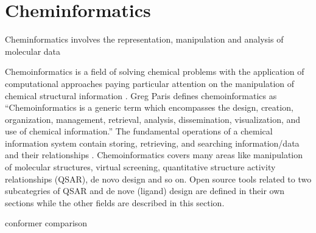 \section{Cheminformatics}
 
Cheminformatics involves the representation, manipulation and analysis of molecular data
  
  Chemoinformatics is a field of solving chemical problems with the application of computational approaches paying particular attention on the manipulation of chemical structural information \cite{Leach_2007} . Greg Paris defines chemoinformatics as “Chemoinformatics is a generic term which encompasses the design, creation, organization, management, retrieval, analysis, dissemination, visualization, and use of chemical information.” The fundamental operations of a chemical information system contain storing, retrieving, and searching information/data and their relationships \cite{Gasteiger_2003}\cite{2003}. Chemoinformatics covers many areas like manipulation of molecular structures, virtual screening, quantitative structure activity relationships (QSAR), de novo design and so on. Open source tools related to two subcategries of QSAR and de nove (ligand) design are defined in their own sections while the other fields are described in this section.
  
  conformer comparison \cite{Ebejer_2012}